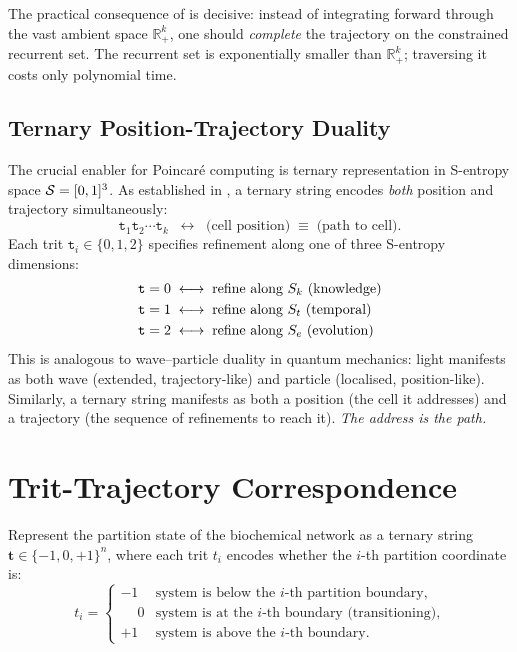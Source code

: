 The practical consequence of  is decisive: instead of
integrating forward through the vast ambient space $\mathbb{R}^k_+$, one
should \emph{complete} the trajectory on the constrained recurrent set.  The
recurrent set is exponentially smaller than $\mathbb{R}^k_+$; traversing it
costs only polynomial time.

\subsection{Ternary Position-Trajectory Duality}

The crucial enabler for Poincaré computing is ternary representation in
S-entropy space $\mathcal{S} = [0,1]^3$.  As established in
, a ternary string encodes \emph{both} position and
trajectory simultaneously:
\begin{equation}
    \mathtt{t}_1\mathtt{t}_2\cdots\mathtt{t}_k
    \;\;\longleftrightarrow\;\;
    \text{(cell position)} \;\equiv\; \text{(path to cell)}.
    \label{eq:ternary-duality}
\end{equation}
Each trit $\mathtt{t}_i \in \{0,1,2\}$ specifies refinement along one of three
S-entropy dimensions:
\begin{align*}
    \mathtt{t} = 0 &\;\longleftrightarrow\; \text{refine along } S_k \text{ (knowledge)} \\
    \mathtt{t} = 1 &\;\longleftrightarrow\; \text{refine along } S_t \text{ (temporal)} \\
    \mathtt{t} = 2 &\;\longleftrightarrow\; \text{refine along } S_e \text{ (evolution)}
\end{align*}
This is analogous to wave--particle duality in quantum mechanics: light
manifests as both wave (extended, trajectory-like) and particle (localised,
position-like).  Similarly, a ternary string manifests as both a position (the
cell it addresses) and a trajectory (the sequence of refinements to reach it).
\emph{The address is the path.}

\section{Trit-Trajectory Correspondence}
\label{sec:trit-traj}

\begin{definition}
\label{def:trit}
Represent the partition state of the biochemical network as a ternary string
$\mathbf{t} \in \{-1,0,+1\}^n$, where each trit $t_i$ encodes whether the
$i$-th partition coordinate is:
\[
    t_i = \begin{cases}
        -1 & \text{system is below the $i$-th partition boundary,} \\
        \phantom{-}0 & \text{system is at the $i$-th boundary (transitioning),} \\
        +1 & \text{system is above the $i$-th boundary.}
    \end{cases}
\]
\end{definition}

